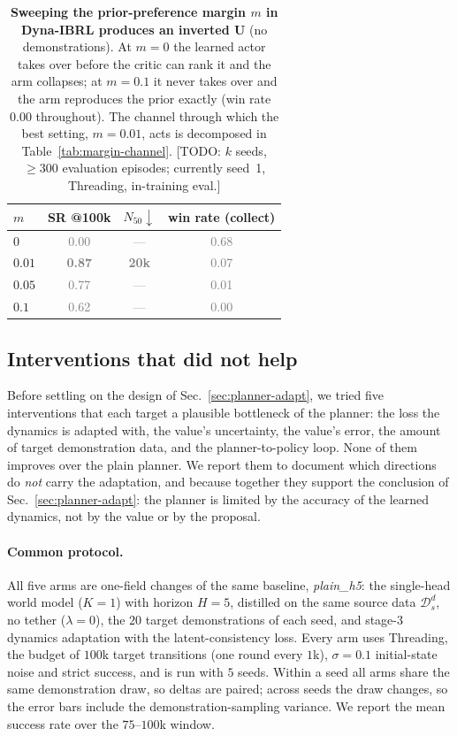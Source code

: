 \documentclass{article} %
\newcommand{\ph}[1]{\textcolor{gray}{#1}}   %
\begin{document}
\begin{table}[h]
\centering
\caption{%
  \textbf{Sweeping the prior-preference margin $m$ in Dyna-IBRL produces an
  inverted U} (no demonstrations). At $m=0$ the learned actor takes over before
  the critic can rank it and the arm collapses; at $m=0.1$ it never takes over
  and the arm reproduces the prior exactly (win rate $0.00$ throughout). The
  channel through which the best setting, $m=0.01$, acts is decomposed in
  Table~\ref{tab:margin-channel}.
  [TODO: $k$ seeds, $\ge 300$ evaluation episodes; currently seed~1, Threading,
  in-training eval.]
}
\label{tab:app-margin-dose}
\begin{tabular}{lccc}
\toprule
$m$ & SR @100k & $N_{50}\downarrow$ & win rate (collect) \\
\midrule
$0$     & \ph{0.00} & \ph{---}  & \ph{0.68} \\
$0.01$  & \ph{\textbf{0.87}} & \ph{\textbf{20k}} & \ph{0.07} \\
$0.05$  & \ph{0.77} & \ph{---}  & \ph{0.01} \\
$0.1$   & \ph{0.62} & \ph{---}  & \ph{0.00} \\
\bottomrule
\end{tabular}
\end{table}

\subsection{Interventions that did not help}
\label{app:negative}

Before settling on the design of Sec.~\ref{sec:planner-adapt}, we tried five
interventions that each target a plausible bottleneck of the planner: the loss
the dynamics is adapted with, the value's uncertainty, the value's error, the
amount of target demonstration data, and the planner-to-policy loop. None of them
improves over the plain planner. We report them to document which directions do
\emph{not} carry the adaptation, and because together they support the conclusion
of Sec.~\ref{sec:planner-adapt}: the planner is limited by the accuracy of the
learned dynamics, not by the value or by the proposal.

\paragraph{Common protocol.}
All five arms are one-field changes of the same baseline, \emph{plain\_h5}: the
single-head world model ($K=1$) with horizon $H=5$, distilled on the same source
data $\mathcal{D}^d_s$, no tether ($\lambda=0$), the $20$ target demonstrations of
each seed, and stage-3 dynamics adaptation with the latent-consistency loss. Every
arm uses Threading, the budget of $100$k target transitions (one round every $1$k),
$\sigma=0.1$ initial-state noise and strict success, and is run with $5$ seeds.
Within a seed all arms share the same demonstration draw, so deltas are paired;
across seeds the draw changes, so the error bars include the demonstration-sampling
variance. We report the mean success rate over the $75$--$100$k window.
\end{document}
